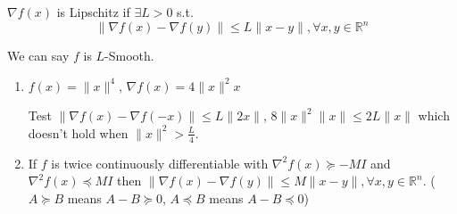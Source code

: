 \documentclass[11pt]{elegantbook}
\begin{document}
\begin{definition}
    $\nabla f(x)$ is Lipschitz if $\exists L>0$ s.t. $$\|\nabla f(x)-\nabla f(y)\|\leq L\|x-y\|,\forall x,y\in \mathbb{R}^n$$
\end{definition}
We can say $f$ is $L$-Smooth.

\begin{example}
    \quad

\begin{enumerate}
    \item $f(x)=\|x\|^4$, $\nabla f(x)=4\|x\|^2x$
    
    Test $\|\nabla f(x)-\nabla f(-x)\|\leq L\|2x\|$, $8\|x\|^2\|x\|\leq 2L\|x\|$ which doesn't hold when $\|x\|^2>\frac{L}{4}$.
    \item If $f$ is twice continuously differentiable with $\nabla^2 f(x)\succeq -MI$ and $\nabla^2 f(x)\preceq  MI$ then $\|\nabla f(x)-\nabla f(y)\|\leq M\|x-y\|,\forall x,y\in \mathbb{R}^n$. ($A\succeq B$ means $A-B\succeq 0$, $A\preceq B$ means $A-B\preceq 0$)
\end{enumerate}
\end{example}
\end{document}
